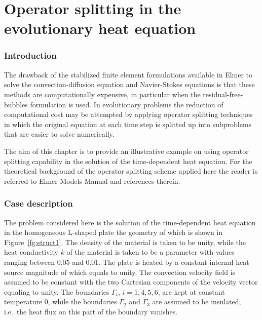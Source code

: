 \chapter{Operator splitting in the evolutionary heat equation}



\subsection*{Introduction}

The drawback of the stabilized finite element formulations available
in Elmer to solve the convection-diffusion equation and Navier-Stokes
equations is that these methods are computationally expensive, in particular
when the residual-free-bubbles formulation is used.
In evolutionary problems the reduction of computational cost may be attempted
by applying operator splitting techniques in which the original equation at
each time step is splitted up into subproblems that are
easier to solve numerically.

The aim of this chapter is to provide an illustrative example on
using operator splitting capability in the solution of the 
time-dependent heat equation. 
For the theoretical background of the operator splitting scheme applied here
the reader is referred to Elmer Models Manual and references therein.



\subsection*{Case description}

The problem considered here is the solution of the time-dependent 
heat equation in the homogeneous L-shaped plate the geometry of which is shown 
in Figure~\ref{fg:struct1}. 
The density of the material is taken to be unity, while the heat 
conductivity $k$ of the material is taken to be a 
parameter with values ranging between 0.05 and 0.01. The plate is
heated by a constant internal heat source magnitude of which equals to unity. 
The convection velocity field is assumed to be constant with the two 
Cartesian components of the velocity vector equaling to unity. 
The boundaries $\Gamma_i$,
$i=1,4,5,6$, are kept at constant temperature $0$, while the boundaries
$\Gamma_2$ and $\Gamma_3$ are assumed to be insulated, i.e.\ the heat flux
on this part of the boundary vanishes. 

